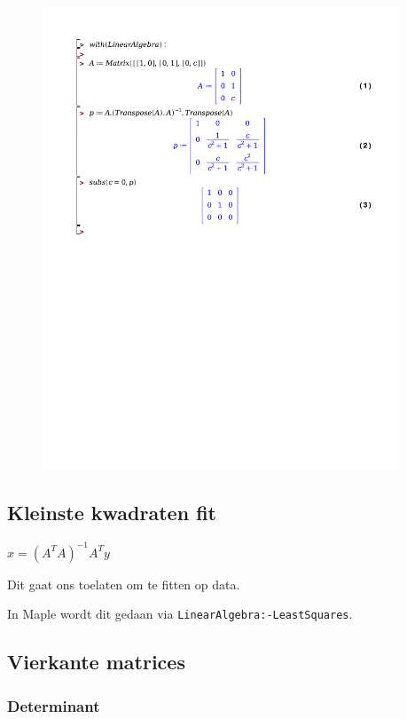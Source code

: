 \documentclass[a4paper]{report}
\begin{document}
\begin{figure}
	\begin{center}
		\includegraphics[width=0.95\textwidth]{./projector.pdf}
	\end{center}
	\caption{}\label{fig:projectie}
\end{figure}

\subsection{Kleinste kwadraten fit}

$x = (A^T A)^{-1} A^T y$

Dit gaat ons toelaten om te fitten op data.

In Maple wordt dit gedaan via \texttt{LinearAlgebra:-LeastSquares}.

\subsection{Vierkante matrices}

\subsubsection{Determinant}
\end{document}
